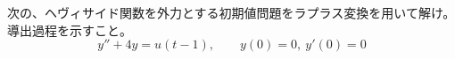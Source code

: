 
次の、ヘヴィサイド関数を外力とする初期値問題をラプラス変換を用いて解け。導出過程を示すこと。
\[
y'' + 4y = u(t - 1), \qquad y(0) = 0,\ y'(0) = 0
\]
